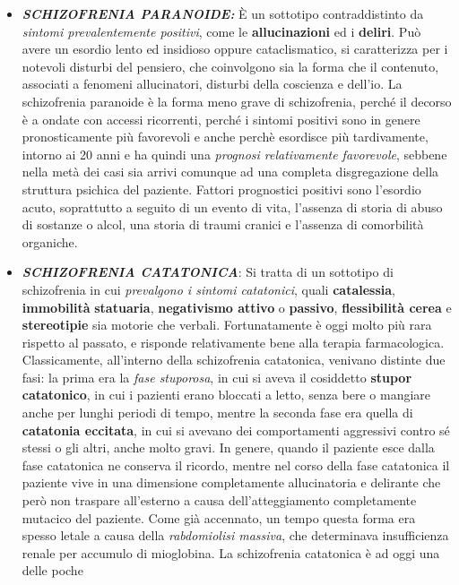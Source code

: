 \begin{itemize}
\item
  \textbf{\emph{SCHIZOFRENIA PARANOIDE:}} È un sottotipo contraddistinto
  da \emph{sintomi prevalentemente positivi}, come le
  \textbf{allucinazioni} ed i \textbf{deliri}. Può avere un esordio
  lento ed insidioso oppure cataclismatico, si caratterizza per i
  notevoli disturbi del pensiero, che coinvolgono sia la forma che il
  contenuto, associati a fenomeni allucinatori, disturbi della coscienza
  e dell'io. La schizofrenia paranoide è la forma meno grave di
  schizofrenia, perché il decorso è a ondate con accessi ricorrenti,
  perché i sintomi positivi sono in genere pronosticamente più
  favorevoli e anche perchè esordisce più tardivamente, intorno ai 20
  anni e ha quindi una \emph{prognosi relativamente favorevole}, sebbene
  nella metà dei casi sia arrivi comunque ad una completa disgregazione
  della struttura psichica del paziente. Fattori prognostici positivi
  sono l'esordio acuto, soprattutto a seguito di un evento di vita,
  l'assenza di storia di abuso di sostanze o alcol, una storia di traumi
  cranici e l'assenza di comorbilità organiche.
\item
  \textbf{\emph{SCHIZOFRENIA CATATONICA}}: Si tratta di un sottotipo di
  schizofrenia in cui \emph{prevalgono i sintomi catatonici}, quali
  \textbf{catalessia}, \textbf{immobilità} \textbf{statuaria},
  \textbf{negativismo attivo} o \textbf{passivo}, \textbf{flessibilità
  cerea} e \textbf{stereotipie} sia motorie che verbali. Fortunatamente
  è oggi molto più rara rispetto al passato, e risponde relativamente
  bene alla terapia farmacologica. Classicamente, all'interno della
  schizofrenia catatonica, venivano distinte due fasi: la prima era la
  \emph{fase stuporosa}, in cui si aveva il cosiddetto \textbf{stupor
  catatonico}, in cui i pazienti erano bloccati a letto, senza bere o
  mangiare anche per lunghi periodi di tempo, mentre la seconda fase era
  quella di \textbf{catatonia eccitata}, in cui si avevano dei
  comportamenti aggressivi contro sé stessi o gli altri, anche molto
  gravi. In genere, quando il paziente esce dalla fase catatonica ne
  conserva il ricordo, mentre nel corso della fase catatonica il
  paziente vive in una dimensione completamente allucinatoria e
  delirante che però non traspare all'esterno a causa dell'atteggiamento
  completamente mutacico del paziente. Come già accennato, un tempo
  questa forma era spesso letale a causa della \emph{rabdomiolisi
  massiva}, che determinava insufficienza renale per accumulo di
  mioglobina. La schizofrenia catatonica è ad oggi una delle poche

\end{itemize}
